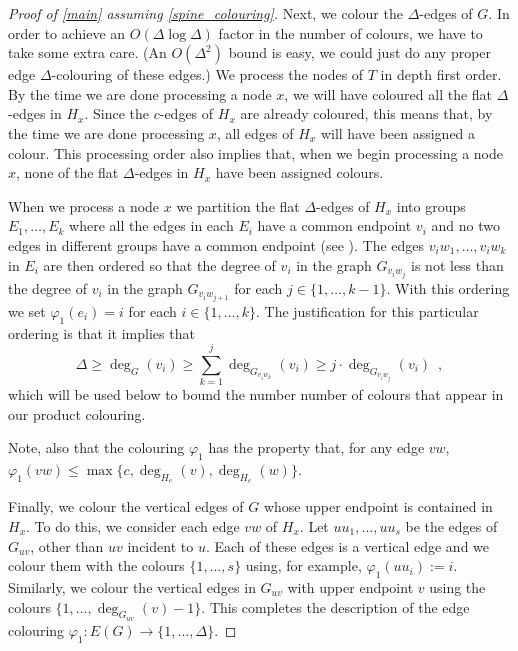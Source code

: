 \documentclass[kpfonts]{patmorin}
\begin{document}
\begin{proof}[Proof of \cref{main} assuming \cref{spine_colouring}]
    Next, we colour the $\Delta$-edges of $G$. In order to achieve an $O(\Delta\log\Delta)$ factor in the number of colours, we have to take some extra care.  (An $O(\Delta^2)$ bound is easy, we could just do any proper edge $\Delta$-colouring of these edges.)  We process the nodes of $T$ in depth first order.  By the time we are done processing a node $x$, we will have coloured all the flat $\Delta$-edges in $H_x$.  Since the $c$-edges of $H_x$ are already coloured, this means that, by the time we are done processing $x$, all edges of $H_x$ will have been assigned a colour.  This processing order also implies that, when we begin processing a node $x$, none of the flat $\Delta$-edges in $H_x$ have been assigned colours.

    When we process a node $x$ we partition the flat $\Delta$-edges of $H_x$ into groups $E_1,\ldots,E_k$ where all the edges in each $E_i$ have a common endpoint $v_i$ and no two edges in different groups have a common endpoint (see ).  The edges $v_iw_1,\ldots,v_iw_k$ in $E_i$ are then ordered so that the degree of $v_i$ in the graph $G_{v_iw_j}$ is not less than the degree of $v_i$ in the graph $G_{v_iw_{j+1}}$ for each $j\in\{1,\ldots,k-1\}$.  With this ordering we set $\varphi_1(e_i)=i$ for each $i\in\{1,\ldots,k\}$.  The justification for this particular ordering is that it implies that
    \begin{equation}
      \Delta\ge \deg_G(v_i)\ge \sum_{k=1}^j \deg_{G_{v_iw_k}}(v_i)\ge  j\cdot\deg_{G_{v_iw_j}}(v_i) \enspace ,
      \label{harmonic_bounder}
    \end{equation}
    which will be used below to bound the number number of colours that appear in our product colouring.

    Note, also that the colouring $\varphi_1$ has the property that, for any edge $vw$, $\varphi_1(vw) \le \max\{c, \deg_{H_{e}}(v), \deg_{H_e}(w)\}$.

    Finally, we colour the vertical edges of $G$ whose upper endpoint is contained in $H_x$.  To do this, we consider each edge $vw$ of $H_x$.  Let $uu_1,\ldots,uu_s$ be the edges of $G_{uv}$, other than $uv$ incident to $u$. Each of these edges is a vertical edge and we colour them with the colours $\{1,\ldots,s\}$ using, for example, $\varphi_1(uu_i):=i$.  Similarly, we colour the vertical edges in $G_{uv}$ with upper endpoint $v$ using the colours $\{1,\ldots,\deg_{G_{uv}}(v)-1\}$.  This completes the description of the edge colouring $\varphi_1:E(G)\to\{1,\ldots,\Delta\}$.


\end{proof}
\end{document}
